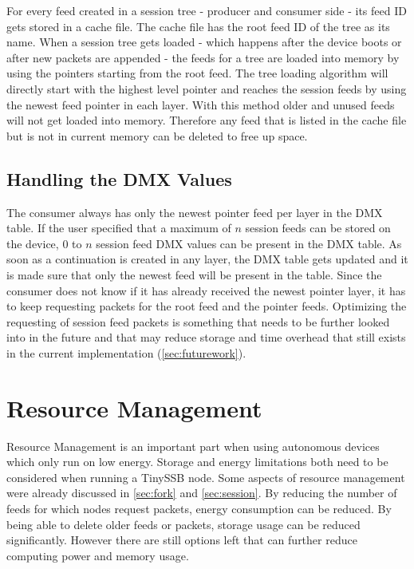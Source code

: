 For every feed created in a session tree - producer and consumer side - its feed ID gets stored in a cache file. The cache file has the root feed ID of the tree as its name. When a session tree gets loaded - which happens after the device boots or after new packets are appended - the feeds for a tree are loaded into memory by using the pointers starting from the root feed. The tree loading algorithm will directly start with the highest level pointer and reaches the session feeds by using the newest feed pointer in each layer. With this method older and unused feeds will not get loaded into memory. Therefore any feed that is listed in the cache file but is not in current memory can be deleted to free up space.


\subsection{Handling the DMX Values}
The consumer always has only the newest pointer feed per layer in the DMX table. If the user specified that a maximum of $n$ session feeds can be stored on the device, 0 to $n$ session feed DMX values can be present in the DMX table. As soon as a continuation is created in any layer, the DMX table gets updated and it is made sure that only the newest feed will be present in the table. Since the consumer does not know if it has already received the newest pointer layer, it has to keep requesting packets for the root feed and the pointer feeds. Optimizing the requesting of session feed packets is something that needs to be further looked into in the future and that may reduce storage and time overhead that still exists in the current implementation (\cref{sec:futurework}).

\newpage

\section{Resource Management}
Resource Management is an important part when using autonomous devices which only run on low energy. Storage and energy limitations both need to be considered when running a TinySSB node. Some aspects of resource management were already discussed in \cref{sec:fork} and \cref{sec:session}. By reducing the number of feeds for which nodes request packets, energy consumption can be reduced. By being able to delete older feeds or packets, storage usage can be reduced significantly.
However there are still options left that can further reduce computing power and memory usage.

